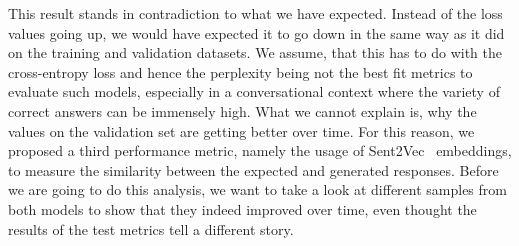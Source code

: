 This result stands in contradiction to what we have expected. Instead of the loss values going up, we would have expected it to go down in the same way as it did on the training and validation datasets. We assume, that this has to do with the cross-entropy loss and hence the perplexity being not the best fit metrics to evaluate such models, especially in a conversational context where the variety of correct answers can be immensely high. What we cannot explain is, why the values on the validation set are getting better over time. For this reason, we proposed a third performance metric, namely the usage of Sent2Vec~\cite{Pgj:2017} embeddings, to measure the similarity between the expected and generated responses. Before we are going to do this analysis, we want to take a look at different samples from both models to show that they indeed improved over time, even thought the results of the test metrics tell a different story.

